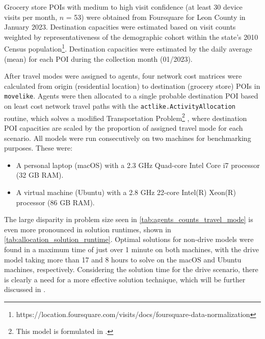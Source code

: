 

Grocery store POIs with medium to high visit confidence (at least 30 device visits per month, $n$ = 53) were obtained from Foursquare for Leon County in January 2023. Destination capacities were estimated based on visit counts weighted by representativeness of the demographic cohort within the state's 2010 Census population\footnote{https://location.foursquare.com/visits/docs/foursquare-data-normalization}. Destination capacities were estimated by the daily average (mean) for each POI during the collection month (01/2023).

After travel modes were assigned to agents, four network cost matrices were calculated from origin (residential location) to destination (grocery store) POIs in \texttt{movelike}. Agents were then allocated to a single probable destination POI based on least cost network travel paths with the \texttt{actlike.ActivityAllocation} routine, which solves a modified Transportation Problem\footnote{This model is formulated in \cite{likeness-scipy-paper-2022}.} \cite{hitchcock_distribution_1941, koopmans_optimum_1949, miller_geographic_2001, tp_miller_gc__2015}, where destination POI capacities are scaled \cite{lovelace_truncate_2013} by the proportion of assigned travel mode for each scenario. All models were run consecutively on two machines for benchmarking purposes. These were:

\begin{itemize}
    \item A personal laptop (macOS) with a 2.3 GHz Quad-core Intel Core i7 processor (32 GB RAM).
    \item A virtual machine (Ubuntu) with a 2.8 GHz 22-core Intel(R) Xeon(R) processor (86 GB RAM).
\end{itemize}

The large disparity in problem size seen in \autoref{tab:agents_counts_travel_mode} is even more pronounced in solution runtimes, shown in \autoref{tab:allocation_solution_runtime}. Optimal solutions for non-drive models were found in a maximum time of just over 1 minute on both machines, with the drive model taking more than 17 and 8 hours to solve on the macOS and Ubuntu machines, respectively. Considering the solution time for the drive scenario, there is clearly a need for a more effective solution technique, which will be further discussed in .



